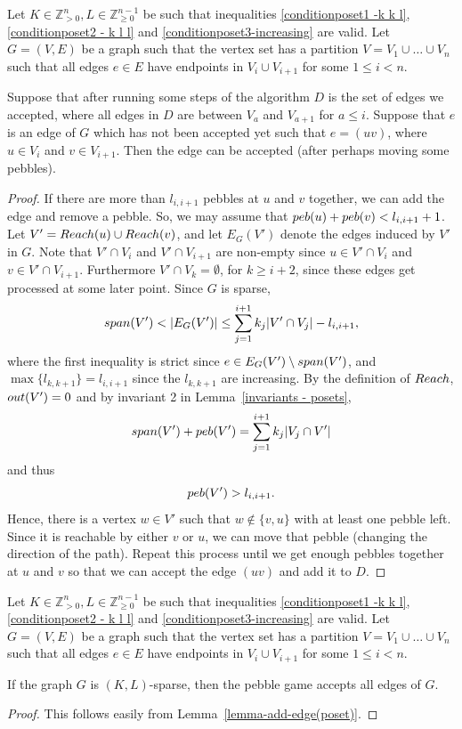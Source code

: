 \documentclass{article}
\begin{document}
\begin{lemma}\label{lemma-add-edge(poset)}
 Let $K\in \mathbb{Z}_{>0}^{n}, L\in \mathbb{Z}_{\geq 0}^{n-1}$ be such that inequalities \eqref{conditionposet1 -k k l}, \eqref{conditionposet2 - k l l} and \eqref{conditionposet3-increasing} are valid. Let $G=(V,E)$ be a graph such that the vertex set has a partition $V=V_1\cup \dots \cup V_n$ such that all edges $e\in E$ have endpoints in $V_{i} \cup V_{i+1}$ for some $1 \leq i < n$. 
 
Suppose that after running some steps of the algorithm $D$ is the set of edges we accepted, where all edges in $D$ are between $V_a$ and $V_{a+1}$ for $a\leq i$. Suppose that $e$ is an edge of $G$ which has not been accepted yet such that $e=(uv)$, where $u\in V_i$ and $v\in V_{i+1}$. Then the edge can be accepted (after perhaps moving some pebbles).
\end{lemma}
\begin{proof}
If there are more than $l_{i, i+1}$ pebbles at $u$ and $v$ together, we can add the edge and remove a pebble. So, we may assume that $\peb(u)+\peb(v)<l_{i, i+1}+1$.
Let $V'=\textup{Reach}(u)\cup \textup{Reach}(v)$, and let $E_G(V')$ denote the edges induced by $V'$ in $G$. Note that $V'\cap V_i$ and $V'\cap  V_{i+1}$ are non-empty since $u\in V'\cap V_i$ and $v\in V'\cap V_{i+1}$. Furthermore $V'\cap V_k =\emptyset$, for $k\geq i+2$, since these edges get processed at some later point. Since $G$ is sparse, $$\spa(V')< \vert E_G(V') \vert \leq \sum_{j=1}^{i+1}k_j\vert V' \cap V_j  \vert - l_{i,i+1},$$ where the first inequality is strict since $e\in  E_G(V') \setminus \spa(V')$, and $\max\{l_{k,k+1}\}=l_{i,i+1}$ since the $l_{k,k+1}$ are increasing. By the definition of $\textup{Reach}$, $\out(V')=0$ and by invariant 2 in Lemma~\ref{invariants - posets}, 
\[
\spa(V')+ \peb(V')= \sum_{j=1}^{i+1}k_j\vert V_j \cap V' \vert
\]
and thus
\[
\peb(V') > l_{i, i+1} .
\]
Hence, there is a vertex $w\in V'$ such that $w\notin \{v,u\}$ with at least one pebble left. Since it is reachable by either $v$ or $u$, we can move that pebble (changing the direction of the path). Repeat this process until we get enough pebbles together at $u$ and $v$ so that we can accept the edge $(uv)$ and add it to $D$.
\end{proof}

\begin{corollary}
  Let $K\in \mathbb{Z}_{>0}^{n}, L\in \mathbb{Z}_{\geq 0}^{n-1}$ be such that inequalities \eqref{conditionposet1 -k k l}, \eqref{conditionposet2 - k l l} and \eqref{conditionposet3-increasing} are valid. Let $G=(V,E)$ be a graph such that the vertex set has a partition $V=V_1\cup \dots \cup V_n$ such that all edges $e\in E$ have endpoints in $V_{i} \cup V_{i+1}$ for some $1 \leq i < n$. 
  
  If the graph $G$ is $(K,L)$-sparse, then the pebble game accepts all edges of $G$.
\end{corollary}
\begin{proof}
This follows easily from Lemma~\ref{lemma-add-edge(poset)}.
\end{proof}
\end{document}
